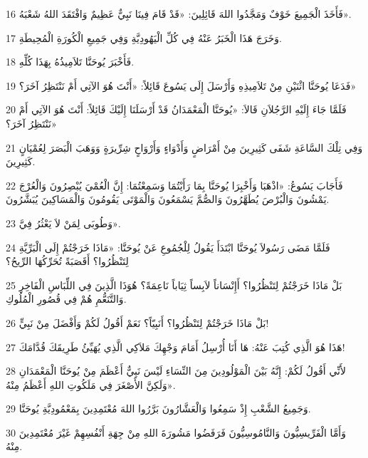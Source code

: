 \par 16 فَأَخَذَ الْجَمِيعَ خَوْفٌ وَمَجَّدُوا اللهَ قَائِلِينَ: «قَدْ قَامَ فِينَا نَبِيٌّ عَظِيمٌ وَافْتَقَدَ اللهُ شَعْبَهُ».
\par 17 وَخَرَجَ هَذَا الْخَبَرُ عَنْهُ فِي كُلِّ الْيَهُودِيَّةِ وَفِي جَمِيعِ الْكُورَةِ الْمُحِيطَةِ.
\par 18 فَأَخْبَرَ يُوحَنَّا تَلاَمِيذُهُ بِهَذَا كُلِّهِ.
\par 19 فَدَعَا يُوحَنَّا اثْنَيْنِ مِنْ تَلاَمِيذِهِ وَأَرْسَلَ إِلَى يَسُوعَ قَائِلاً: «أَنْتَ هُوَ الآتِي أَمْ نَنْتَظِرُ آخَرَ؟»
\par 20 فَلَمَّا جَاءَ إِلَيْهِ الرَّجُلاَنِ قَالاَ: «يُوحَنَّا الْمَعْمَدَانُ قَدْ أَرْسَلَنَا إِلَيْكَ قَائِلاً: أَنْتَ هُوَ الآتِي أَمْ نَنْتَظِرُ آخَرَ؟»
\par 21 وَفِي تِلْكَ السَّاعَةِ شَفَى كَثِيرِينَ مِنْ أَمْرَاضٍ وَأَدْوَاءٍ وَأَرْوَاحٍ شِرِّيرَةٍ وَوَهَبَ الْبَصَرَ لِعُمْيَانٍ كَثِيرِينَ.
\par 22 فَأَجَابَ يَسُوعُ: «اذْهَبَا وَأَخْبِرَا يُوحَنَّا بِمَا رَأَيْتُمَا وَسَمِعْتُمَا: إِنَّ الْعُمْيَ يُبْصِرُونَ وَالْعُرْجَ يَمْشُونَ وَالْبُرْصَ يُطَهَّرُونَ وَالصُّمَّ يَسْمَعُونَ وَالْمَوْتَى يَقُومُونَ وَالْمَسَاكِينَ يُبَشَّرُونَ.
\par 23 وَطُوبَى لِمَنْ لاَ يَعْثُرُ فِيَّ».
\par 24 فَلَمَّا مَضَى رَسُولاَ يُوحَنَّا ابْتَدَأَ يَقُولُ لِلْجُمُوعِ عَنْ يُوحَنَّا: «مَاذَا خَرَجْتُمْ إِلَى الْبَرِّيَّةِ لِتَنْظُرُوا؟ أَقَصَبَةً تُحَرِّكُهَا الرِّيحُ؟
\par 25 بَلْ مَاذَا خَرَجْتُمْ لِتَنْظُرُوا؟ أَإِنْسَاناً لاَبِساً ثِيَاباً نَاعِمَةً؟ هُوَذَا الَّذِينَ فِي اللِّبَاسِ الْفَاخِرِ وَالتَّنَعُّمِ هُمْ فِي قُصُورِ الْمُلُوكِ.
\par 26 بَلْ مَاذَا خَرَجْتُمْ لِتَنْظُرُوا؟ أَنَبِيّاً؟ نَعَمْ أَقُولُ لَكُمْ وَأَفْضَلَ مِنْ نَبِيٍّ!
\par 27 هَذَا هُوَ الَّذِي كُتِبَ عَنْهُ: هَا أَنَا أُرْسِلُ أَمَامَ وَجْهِكَ مَلاَكِي الَّذِي يُهَيِّئُ طَرِيقَكَ قُدَّامَكَ!
\par 28 لأَنِّي أَقُولُ لَكُمْ: إِنَّهُ بَيْنَ الْمَوْلُودِينَ مِنَ النِّسَاءِ لَيْسَ نَبِيٌّ أَعْظَمَ مِنْ يُوحَنَّا الْمَعْمَدَانِ وَلَكِنَّ الأَصْغَرَ فِي مَلَكُوتِ اللهِ أَعْظَمُ مِنْهُ».
\par 29 وَجَمِيعُ الشَّعْبِ إِذْ سَمِعُوا وَالْعَشَّارُونَ بَرَّرُوا اللهَ مُعْتَمِدِينَ بِمَعْمُودِيَّةِ يُوحَنَّا.
\par 30 وَأَمَّا الْفَرِّيسِيُّونَ وَالنَّامُوسِيُّونَ فَرَفَضُوا مَشُورَةَ اللهِ مِنْ جِهَةِ أَنْفُسِهِمْ غَيْرَ مُعْتَمِدِينَ مِنْهُ.
